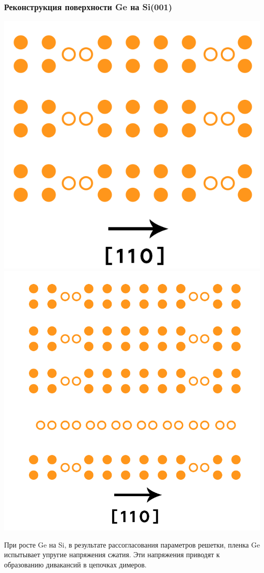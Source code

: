 \documentclass[10pt,pdf,hyperref={unicode}, dvipsnames]{beamer}
\begin{document}
\begin{frame}[t]
	\frametitle{Реконструкция поверхности Ge на Si(001)}
	\includegraphics[width = .49\linewidth]{imgs/Dim2.png}
	\includegraphics[width = .49\linewidth]{imgs/DimM.png}


	При росте Ge на Si, в результате рассогласования параметров решетки, пленка Ge испытывает упругие напряжения сжатия.
	Эти напряжения приводят к образованию дивакансий в цепочках димеров.	
\end{frame}
\end{document}
